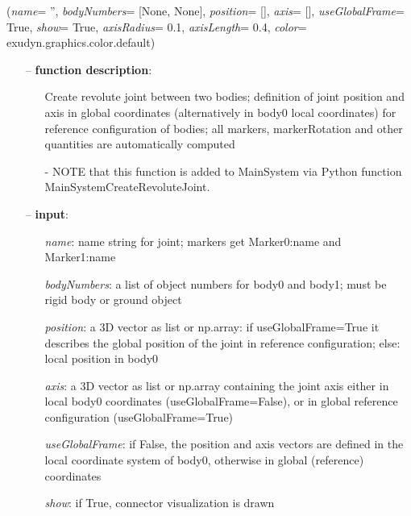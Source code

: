 %
\begin{flushleft}
\label{sec:mainsystemextensions:CreateRevoluteJoint}
({\it name}= '', {\it bodyNumbers}= [None, None], {\it position}= [], {\it axis}= [], {\it useGlobalFrame}= True, {\it show}= True, {\it axisRadius}= 0.1, {\it axisLength}= 0.4, {\it color}= exudyn.graphics.color.default)
\end{flushleft}
\setlength{\itemindent}{0.7cm}
\begin{itemize}[leftmargin=0.7cm]
\item[--]
{\bf function description}: \vspace{-6pt}
\begin{itemize}[leftmargin=1.2cm]
\setlength{\itemindent}{-0.7cm}
\item[]Create revolute joint between two bodies; definition of joint position and axis in global coordinates (alternatively in body0 local coordinates) for reference configuration of bodies; all markers, markerRotation and other quantities are automatically computed
\item[]- NOTE that this function is added to MainSystem via Python function MainSystemCreateRevoluteJoint.
\end{itemize}
\item[--]
{\bf input}: \vspace{-6pt}
\begin{itemize}[leftmargin=1.2cm]
\setlength{\itemindent}{-0.7cm}
\item[]{\it name}: name string for joint; markers get Marker0:name and Marker1:name
\item[]{\it bodyNumbers}: a list of object numbers for body0 and body1; must be rigid body or ground object
\item[]{\it position}: a 3D vector as list or np.array: if useGlobalFrame=True it describes the global position of the joint in reference configuration; else: local position in body0
\item[]{\it axis}: a 3D vector as list or np.array containing the joint axis either in local body0 coordinates (useGlobalFrame=False), or in global reference configuration (useGlobalFrame=True)
\item[]{\it useGlobalFrame}: if False, the position and axis vectors are defined in the local coordinate system of body0, otherwise in global (reference) coordinates
\item[]{\it show}: if True, connector visualization is drawn

\end{itemize}
\end{itemize}
